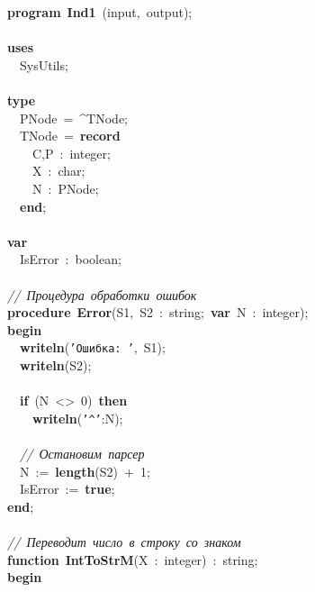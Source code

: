 \noindent
\mbox{}\textbf{program}\ \textbf{Ind1}\ (input,\ output); \\
\mbox{} \\
\mbox{}\textbf{uses} \\
\mbox{}\ \ SysUtils; \\
\mbox{} \\
\mbox{}\textbf{type} \\
\mbox{}\ \ PNode\ =\ \textasciicircum{}TNode; \\
\mbox{}\ \ TNode\ =\ \textbf{record} \\
\mbox{}\ \ \ \ C,P\ :\ integer; \\
\mbox{}\ \ \ \ X\ :\ char; \\
\mbox{}\ \ \ \ N\ :\ PNode; \\
\mbox{}\ \ \textbf{end}; \\
\mbox{} \\
\mbox{}\textbf{var} \\
\mbox{}\ \ IsError\ :\ boolean; \\
\mbox{} \\
\mbox{}\textit{//\ Процедура\ обработки\ ошибок} \\
\mbox{}\textbf{procedure}\ \textbf{Error}(S1,\ S2\ :\ string;\ \textbf{var}\ N\ :\ integer); \\
\mbox{}\textbf{begin} \\
\mbox{}\ \ \textbf{writeln}(\texttt{'Ошибка:\ '},\ S1); \\
\mbox{}\ \ \textbf{writeln}(S2); \\
\mbox{} \\
\mbox{}\ \ \textbf{if}\ (N\ \textless{}\textgreater{}\ 0)\ \textbf{then} \\
\mbox{}\ \ \ \ \textbf{writeln}(\texttt{'\textasciicircum{}'}:N); \\
\mbox{} \\
\mbox{}\ \ \textit{//\ Остановим\ парсер} \\
\mbox{}\ \ N\ :=\ \textbf{length}(S2)\ +\ 1; \\
\mbox{}\ \ IsError\ :=\ \textbf{true}; \\
\mbox{}\textbf{end}; \\
\mbox{} \\
\mbox{}\textit{//\ Переводит\ число\ в\ строку\ со\ знаком} \\
\mbox{}\textbf{function}\ \textbf{IntToStrM}(X\ :\ integer)\ :\ string; \\
\mbox{}\textbf{begin} \\

